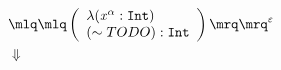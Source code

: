 \documentclass{article}
\begin{document}
\tiny\begin{align*}
&\quot{\left(\begin{array}{l} \lambda (\mathit{x}^{\mathit{\alpha}}:\mathtt{Int})\\(\sim TODO) : \mathtt{Int}\end{array}\right)}^{\varepsilon}\\ 
&\Downarrow\\ 
\end{align*}
\end{document}
